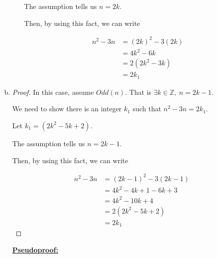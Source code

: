 \documentclass[12pt]{article}
\begin{document}
\begin{enumerate}[a.]
\begin{mdframed}
\begin{itemize}
            \begin{mdframed}
            The assumption tells us $n = 2k$.

            \bigskip

            Then, by using this fact, we can write

            \begin{align}
                n^2 - 3n &= (2k)^2 - 3(2k)\\
                &= 4k^2 - 6k\\
                &= 2(2k^2 - 3k)\\
                &= 2k_1
            \end{align}
            \end{mdframed}

        \end{itemize}

    \end{mdframed}

    \item

    \begin{proof}

        In this case, assume $Odd(n)$. That is $\exists k \in \mathbb{Z},\:n = 2k - 1$.

        \bigskip

        We need to show there is an integer $k_1$ such that $n^2 - 3n = 2k_1$.

        \bigskip

        Let $k_1 = (2k^2 - 5k + 2)$.

        \bigskip

        The assumption tells us $n = 2k-1$.

        \bigskip

        Then, by using this fact, we can write

        \setcounter{equation}{0}
        \begin{align}
            n^2 - 3n &= (2k-1)^2 - 3(2k-1)\\
            &= 4k^2-4k+1-6k+3\\
            &= 4k^2 -10k + 4\\
            &= 2(2k^2 - 5k + 2)\\
            &= 2k_1
        \end{align}

    \end{proof}

    \bigskip

    \begin{mdframed}
        \underline{\textbf{Pseudoproof:}}


\end{mdframed}
\end{enumerate}
\end{document}
